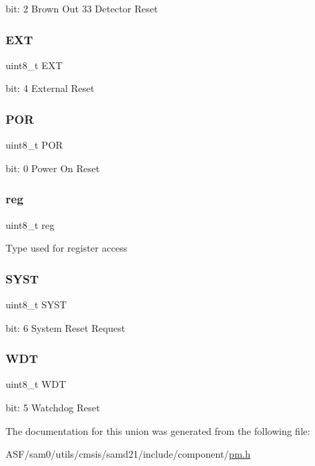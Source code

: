 bit\+: 2 Brown Out 33 Detector Reset \mbox{\label{union_p_m___r_c_a_u_s_e___type_ab2b0a9353cd632c2007a04cf6c7f365c}} 
\subsubsection{\texorpdfstring{EXT}{EXT}}
{\footnotesize\ttfamily uint8\+\_\+t E\+XT}

bit\+: 4 External Reset \mbox{\label{union_p_m___r_c_a_u_s_e___type_a81bfdbef9cf92fd56e34762800cf6848}} 
\subsubsection{\texorpdfstring{POR}{POR}}
{\footnotesize\ttfamily uint8\+\_\+t P\+OR}

bit\+: 0 Power On Reset \mbox{\label{union_p_m___r_c_a_u_s_e___type_a9428adc9af4653a2050e2536b55dec8d}} 
\subsubsection{\texorpdfstring{reg}{reg}}
{\footnotesize\ttfamily uint8\+\_\+t reg}

Type used for register access \mbox{\label{union_p_m___r_c_a_u_s_e___type_a394eabd9a76c665e2424898008388739}} 
\subsubsection{\texorpdfstring{SYST}{SYST}}
{\footnotesize\ttfamily uint8\+\_\+t S\+Y\+ST}

bit\+: 6 System Reset Request \mbox{\label{union_p_m___r_c_a_u_s_e___type_a8b4755d38be6cb1d3dec3086dbf93b8d}} 
\subsubsection{\texorpdfstring{WDT}{WDT}}
{\footnotesize\ttfamily uint8\+\_\+t W\+DT}

bit\+: 5 Watchdog Reset 

The documentation for this union was generated from the following file\+:\begin{DoxyCompactItemize}
\item 
A\+S\+F/sam0/utils/cmsis/samd21/include/component/\mbox{\hyperlink{component_2pm_8h}{pm.\+h}}\end{DoxyCompactItemize}
